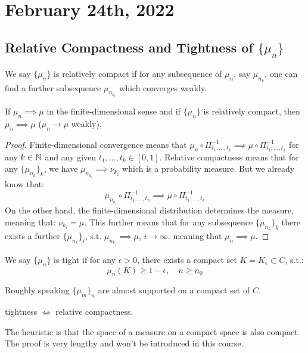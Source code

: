\documentclass[../main/main.tex]{subfiles}
\begin{document}
\section{February 24th, 2022}
\subsection{Relative Compactness and Tightness of $\{\mu_n\}$}
\begin{definition}
	We say $\{\mu_n\}$ is relatively compact if for any subsequence of $\mu_n$, say $\mu_{n_k}$, one can find a further subsequence $\mu_{n_{k_{i}}}$ which converges weakly.
\end{definition}

\begin{proposition}
	If $\mu_n \implies \mu$ in the finite-dimensional sense and if $\{\mu_n\}$ is relatively compact, then $\mu_n \implies \mu$ ($\mu_n \to \mu$ weakly).
\end{proposition}

\begin{proof} Finite-dimensional convergence means that $ \mu_n \circ \Pi_{t_1, \ldots , t_k}^{-1} \implies \mu \circ \Pi_{t_1, \ldots , t_k}^{-1}$ for any $k \in \mathbb{N}$ and any given $t_1, \ldots , t_k \in [0,1]$. Relative compactness means that for any $\{\mu_{n_k}\}_k$, we have $\mu_{n_{k_i}}\implies \nu_{k_i}$ which is a probability measure. But we already know that: \[
		\mu_{n_{k_i}} \circ \Pi_{t_1, \ldots , t_n}^{-1} \implies \mu \circ \Pi_{t_1, \ldots , t_k} ^{-1}
	\]
	On the other hand, the finite-dimensional distribution determines the measure, meaning that: $ \nu_{k_i} = \mu.$ This further means that for any subsequence $\{\mu_{n_{k}}\}_{k}$ there exists a further $\{\mu_{n_{k}}\}_{i}$, s.t. $\mu_{n_{k_{i}}} \implies \mu$, $i \to \infty$. meaning that $\mu_{n} \implies \mu$.
\end{proof}

\begin{definition}
	We say $\{\mu_n\}$ is tight if for any $\epsilon > 0$, there exists a compact set $K = K_{\epsilon} \subset C$, s.t.: \[
		\mu_{n} (K) \geq 1-\epsilon , \quad n \geq n_0
	\]
\end{definition}
\begin{remark}
	Roughly speaking $\{\mu_{m}\}_{n}$ are almost supported on a compact set of $C$.
\end{remark}
\begin{theorem} tightness $\iff $ relative compactness.
\end{theorem}
The heuristic is that the space of a measure on a compact space is also compact. The proof is very lengthy and won't be introduced in this course.\\
\end{document}
